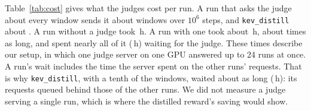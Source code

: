 \begin{table}[t]
\centering\small

\caption{Cost per run, averaged over tasks and seeds: windows sent to the judge, time spent waiting for its answers,
wall-clock time of the run, and the mean correlation, per rollout, between the window scores the run trained on and the
environment's reward of the same windows. One judge server on one GPU served up to 24 concurrent runs, so the waits include
the time it spent on the other runs' requests.}
\label{tab:cost}
\end{table}

Table~\ref{tab:cost} gives what the judges cost per run. A run that asks the judge about every window sends it about
 windows over $10^6$ steps, and \texttt{kev\_distill} about . A run
without a judge took \,h. A run with one took about \,h, about 
times as long, and spent nearly all of it (\,h) waiting for the judge. These times describe our
setup, in which one judge server on one GPU answered up to 24 runs at once. A run's wait includes the time the server
spent on the other runs' requests. That is why \texttt{kev\_distill}, with a tenth of the windows, waited about as long
(\,h): its requests queued behind those of the other runs. We did not measure a judge serving a
single run, which is where the distilled reward's saving would show.
